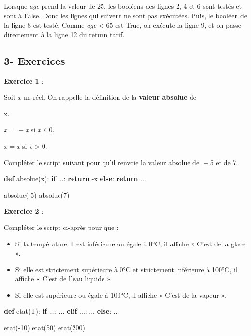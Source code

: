 \documentclass[
  paper=a4,
  ,captions=tableheading
]{scrartcl}
\newenvironment{Shaded}{}{}
\newcommand{\ControlFlowTok}[1]{\textcolor[rgb]{0.00,0.44,0.13}{\textbf{#1}}}
\newcommand{\DecValTok}[1]{\textcolor[rgb]{0.25,0.63,0.44}{#1}}
\newcommand{\KeywordTok}[1]{\textcolor[rgb]{0.00,0.44,0.13}{\textbf{#1}}}
\newcommand{\NormalTok}[1]{#1}
\newcommand{\OperatorTok}[1]{\textcolor[rgb]{0.40,0.40,0.40}{#1}}
\begin{document}
Lorsque \emph{age} prend la valeur de 25, les booléens des lignes 2, 4
et 6 sont testés et sont à False. Donc les lignes qui suivent ne sont
pas exécutées. Puis, le booléen de la ligne 8 est testé. Comme
\emph{age} \textless{} 65 est True, on exécute la ligne 9, et on passe
directement à la ligne 12 du return tarif.

\hypertarget{3--exercices}{%
\subsection{3- Exercices}\label{3--exercices}}

\textbf{Exercice 1} :

Soit \emph{x} un réel. On rappelle la définition de la \textbf{valeur
absolue} de

x.

\textbar{}\emph{x}\textbar{} =  − \emph{x} si \emph{x} ≤ 0.

\textbar{}\emph{x}\textbar{} = \emph{x} si \emph{x} \textgreater{} 0.

Compléter le script suivant pour qu'il renvoie la valeur absolue de  − 5
et de 7.

\begin{Shaded}
\begin{Highlighting}[]
\KeywordTok{def}\NormalTok{ absolue(x):}
    \ControlFlowTok{if}\NormalTok{ ...:}
        \ControlFlowTok{return} \OperatorTok{{-}}\NormalTok{x}
    \ControlFlowTok{else}\NormalTok{:}
        \ControlFlowTok{return}\NormalTok{ ...}


\NormalTok{absolue(}\OperatorTok{{-}}\DecValTok{5}\NormalTok{)}
\NormalTok{absolue(}\DecValTok{7}\NormalTok{)}
\end{Highlighting}
\end{Shaded}

\textbf{Exercice 2} :

Compléter le script ci-après pour que :

\begin{itemize}
\item
  Si la température T est inférieure ou égale à 0°C, il affiche « C'est
  de la glace ».
\item
  Si elle est strictement supérieure à 0°C et strictement inférieure à
  100°C, il affiche « C'est de l'eau liquide ».
\item
  Si elle est supérieure ou égale à 100°C, il affiche « C'est de la
  vapeur ».
\end{itemize}

\begin{Shaded}
\begin{Highlighting}[]
\KeywordTok{def}\NormalTok{ etat(T):}
    \ControlFlowTok{if}\NormalTok{ ...:}
\NormalTok{        ...}
    \ControlFlowTok{elif}\NormalTok{ ...:}
\NormalTok{        ...}
    \ControlFlowTok{else}\NormalTok{:}
\NormalTok{        ...}


\NormalTok{etat(}\OperatorTok{{-}}\DecValTok{10}\NormalTok{)}
\NormalTok{etat(}\DecValTok{50}\NormalTok{)}
\NormalTok{etat(}\DecValTok{200}\NormalTok{)}
\end{Highlighting}
\end{Shaded}
\end{document}
